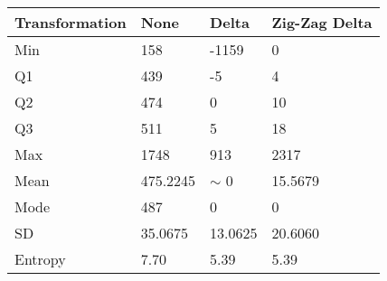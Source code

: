     \begin{tabular}{|l|l|l|l|}
        \hline
Transformation & None & Delta & Zig-Zag Delta\\
        \hline
Min & 158& -1159& 0\\
	    Q1 & 439& -5& 4\\

Q2 & 474& 0& 10\\
	    Q3 & 511& 5& 18\\
Max & 1748& 913& 2317\\
\hline
Mean & 475.2245& $\sim$ 0& 15.5679\\
	    Mode & 487& 0& 0\\
SD & 35.0675& 13.0625& 20.6060\\
	\hline
	    Entropy & 7.70 & 5.39 & 5.39\\
	\hline
    \end{tabular}
